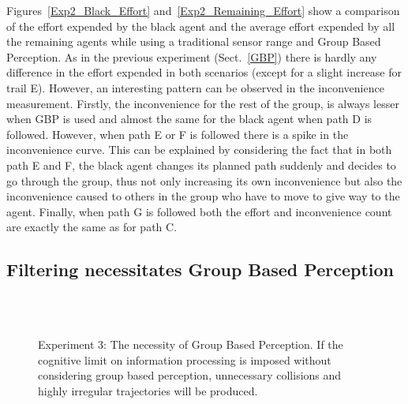 \documentclass[runningheads,a4paper]{llncs}
\begin{document}
Figures~\ref{Exp2_Black_Effort} and~\ref{Exp2_Remaining_Effort} show a comparison of the effort expended by the black agent and the average effort expended by all the remaining agents while using a traditional sensor range and Group Based Perception. As in the previous experiment (Sect.~\ref{GBP}) there is hardly any difference in the effort expended in both scenarios (except for a slight increase for trail E). However, an interesting pattern can be observed in the inconvenience measurement. Firstly, the inconvenience for the rest of the group, is always lesser when GBP is used and almost the same for the black agent when path D is followed. However, when path E or F is followed there is a spike in the inconvenience curve. This can be explained by considering the fact that in both path E and F, the black agent changes its planned path suddenly and decides to go through the group, thus not only increasing its own inconvenience but also the inconvenience caused to others in the group who have to move to give way to the agent. Finally, when path G is followed both the effort and inconvenience count are exactly the same as for path C.

\subsection{Filtering necessitates Group Based Perception}


\begin{figure}[!t]
  \centering
   \\
  \hspace{1pt}
  \\
  \hspace{1pt}
  \caption{Experiment 3: The necessity of Group Based Perception. If the cognitive limit on information processing is imposed without considering group based perception, unnecessary collisions and highly irregular trajectories will be produced.}
  \label{Exp3}
\end{figure}
\end{document}
